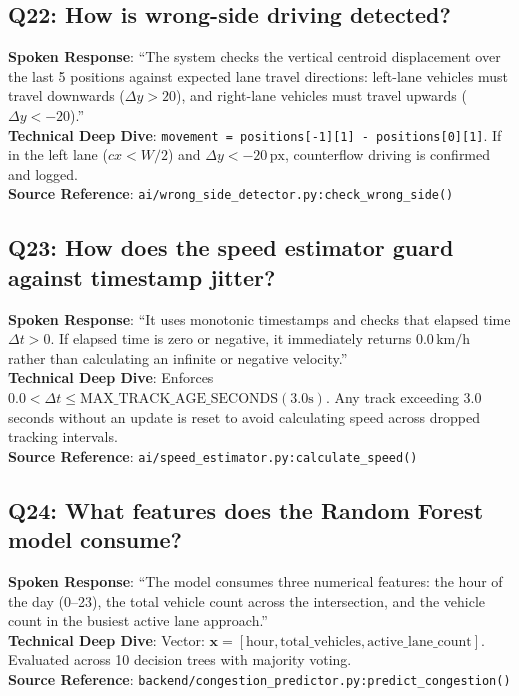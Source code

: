 \documentclass[11pt,a4paper,oneside]{report}
\begin{document}
\subsection*{Q22: How is wrong-side driving detected?}
\begin{interviewbox}
\textbf{Spoken Response}: ``The system checks the vertical centroid displacement over the last 5 positions against expected lane travel directions: left-lane vehicles must travel downwards ($\Delta y > 20$), and right-lane vehicles must travel upwards ($\Delta y < -20$).''\\
\textbf{Technical Deep Dive}: \texttt{movement = positions[-1][1] - positions[0][1]}. If in the left lane ($cx < W/2$) and $\Delta y < -20\,\text{px}$, counterflow driving is confirmed and logged.\\
\textbf{Source Reference}: \texttt{ai/wrong\_side\_detector.py:check\_wrong\_side()}
\end{interviewbox}

\subsection*{Q23: How does the speed estimator guard against timestamp jitter?}
\begin{interviewbox}
\textbf{Spoken Response}: ``It uses monotonic timestamps and checks that elapsed time $\Delta t > 0$. If elapsed time is zero or negative, it immediately returns $0.0\,\text{km/h}$ rather than calculating an infinite or negative velocity.''\\
\textbf{Technical Deep Dive}: Enforces $0.0 < \Delta t \le \text{MAX\_TRACK\_AGE\_SECONDS} (3.0\text{s})$. Any track exceeding 3.0 seconds without an update is reset to avoid calculating speed across dropped tracking intervals.\\
\textbf{Source Reference}: \texttt{ai/speed\_estimator.py:calculate\_speed()}
\end{interviewbox}

\subsection*{Q24: What features does the Random Forest model consume?}
\begin{interviewbox}
\textbf{Spoken Response}: ``The model consumes three numerical features: the hour of the day (0--23), the total vehicle count across the intersection, and the vehicle count in the busiest active lane approach.''\\
\textbf{Technical Deep Dive}: Vector: $\mathbf{x} = [\text{hour}, \text{total\_vehicles}, \text{active\_lane\_count}]$. Evaluated across 10 decision trees with majority voting.\\
\textbf{Source Reference}: \texttt{backend/congestion\_predictor.py:predict\_congestion()}
\end{interviewbox}
\end{document}
